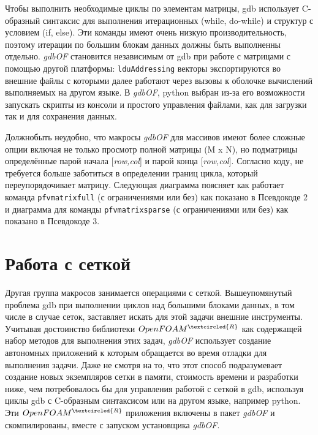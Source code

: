 \documentclass[a4paper,10pt]{book}
\begin{document}
Чтобы выполнить необходимые циклы по элементам матрицы, gdb использует C-образный синтаксис для выполнения итерационных (while, do-while) и
структур с условием (if, else). Эти команды имеют очень низкую производительность, поэтому итерации по большим блокам данных должны быть
выполненны отдельно. \textit{gdbOF} становится независимым от gdb при работе с матрицами с помощью другой платформы: \texttt{lduAddressing}
векторы экспортируются во внешние файлы с которыми далее работают через вызовы к оболочке вычислений выполняемых на другом языке.
В \textit{gdbOF}, python выбран из-за его возможности запускать скрипты из консоли и простого управления файлами, как для загрузки так 
и для сохранения данных.

Должнобыть неудобно, что макросы \textit{gdbOF} для массивов имеют более сложные опции включая не только просмотр полной матрицы (M x N), но
подматрицы определённые парой начала [\textit{row,col}] и парой конца [\textit{row,col}]. Согласно коду, не требуется больше заботиться
в определении границ цикла, который переупорядочивает матрицу. Следующая диаграмма поясняет как работает команда \texttt{pfvmatrixfull}
(с ограничениями или без) как показано в Псевдокоде 2 и диаграмма для команды \texttt{pfvmatrixsparse} (с ограничениями или без) как показано
в Псевдокоде 3.

\section{Работа с сеткой}
\label{sec:3.2}

Другая группа макросов занимается операциями с сеткой. Вышеупомянутый проблема gdb при выполнении циклов над большими блоками данных,
 в том числе 
в случае сеток, заставляет искать для этой задачи внешние инструменты. Учитывая достоинство библиотеки $OpenFOAM^{\tiny\textcircled{R}}$ как
содержащей набор методов для выполнения этих задач, \textit{gdbOF} использует создание автономных приложений к которым обращается во 
время отладки для выполнения задачи. Даже не смотря на то, что этот способ подразумевает создание новых экземпляров сетки в памяти,
 стоимость времени и разработки ниже, чем потребовалось бы для управления работой с сеткой в gdb, используя циклы gdb с C-образным 
синтаксисом или на другом языке, например python. Эти $OpenFOAM^{\tiny\textcircled{R}}$ приложения включены в пакет \textit{gdbOF} и 
скомпилированы, вместе с запуском установщика \textit{gdbOF}.
\end{document}
